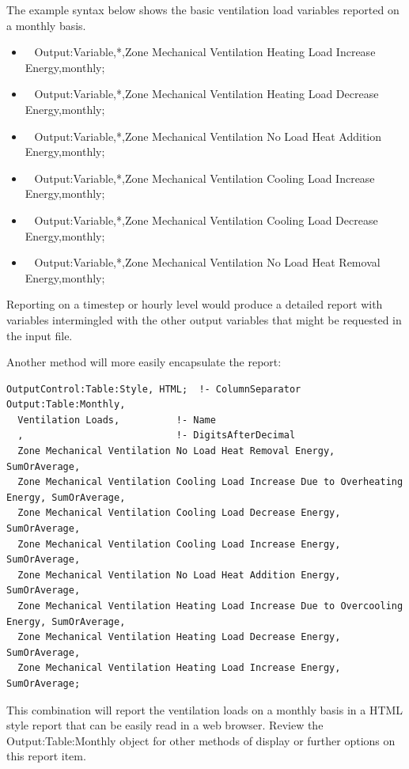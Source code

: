 The example syntax below shows the basic ventilation load variables reported on a monthly basis.

\begin{itemize}
\item
  ~ Output:Variable,*,Zone Mechanical Ventilation Heating Load Increase Energy,monthly;
\item
  ~ Output:Variable,*,Zone Mechanical Ventilation Heating Load Decrease Energy,monthly;
\item
  ~ Output:Variable,*,Zone Mechanical Ventilation No Load Heat Addition Energy,monthly;
\item
  ~ Output:Variable,*,Zone Mechanical Ventilation Cooling Load Increase Energy,monthly;
\item
  ~ Output:Variable,*,Zone Mechanical Ventilation Cooling Load Decrease Energy,monthly;
\item
  ~ Output:Variable,*,Zone Mechanical Ventilation No Load Heat Removal Energy,monthly;
\end{itemize}

Reporting on a timestep or hourly level would produce a detailed report with variables intermingled with the other output variables that might be requested in the input file.

Another method will more easily encapsulate the report:

\begin{lstlisting}
OutputControl:Table:Style, HTML;  !- ColumnSeparator
Output:Table:Monthly,
  Ventilation Loads,          !- Name
  ,                           !- DigitsAfterDecimal
  Zone Mechanical Ventilation No Load Heat Removal Energy, SumOrAverage,
  Zone Mechanical Ventilation Cooling Load Increase Due to Overheating Energy, SumOrAverage,
  Zone Mechanical Ventilation Cooling Load Decrease Energy, SumOrAverage,
  Zone Mechanical Ventilation Cooling Load Increase Energy, SumOrAverage,
  Zone Mechanical Ventilation No Load Heat Addition Energy, SumOrAverage,
  Zone Mechanical Ventilation Heating Load Increase Due to Overcooling Energy, SumOrAverage,
  Zone Mechanical Ventilation Heating Load Decrease Energy, SumOrAverage,
  Zone Mechanical Ventilation Heating Load Increase Energy, SumOrAverage;
\end{lstlisting}

This combination will report the ventilation loads on a monthly basis in a HTML style report that can be easily read in a web browser. Review the Output:Table:Monthly object for other methods of display or further options on this report item.

